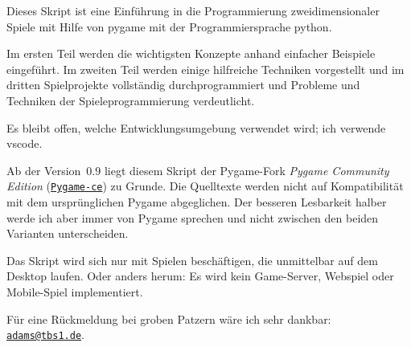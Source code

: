 Dieses Skript ist eine Einführung in die Programmierung zweidimensionaler Spiele mit Hilfe von \Gls{pygame} mit der Programmiersprache \Gls{python}. 

Im ersten Teil werden die wichtigsten Konzepte anhand einfacher Beispiele eingeführt. Im zweiten Teil werden einige hilfreiche Techniken vorgestellt und im dritten Spielprojekte vollständig durchprogrammiert und Probleme und Techniken der Spieleprogrammierung verdeutlicht.

Es bleibt offen, welche Entwicklungsumgebung verwendet wird; ich verwende \Gls{vscode}.

Ab der Version~$0.9$ liegt diesem Skript der Pygame-Fork \emph{Pygame Community Edition} (\href{https://pyga.me/}{\nolinkurl{Pygame-ce}}) zu Grunde. Die Quelltexte werden nicht auf Kompatibilität mit dem ursprünglichen Pygame abgeglichen. Der besseren Lesbarkeit halber werde ich aber immer von Pygame sprechen und nicht zwischen den beiden Varianten unterscheiden.

Das Skript wird sich nur mit Spielen beschäftigen, die unmittelbar auf dem Desktop laufen. Oder anders herum: Es wird kein Game-Server, Webspiel oder Mobile-Spiel implementiert. 

Für eine Rückmeldung bei groben Patzern wäre ich sehr dankbar: \href{mailto:adams@tbs1.de}{\nolinkurl{adams@tbs1.de}}.
